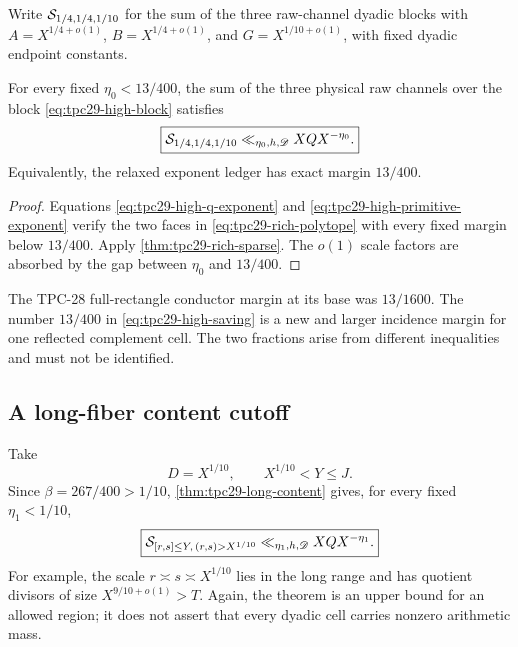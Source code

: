 Write $\mathcal S_{1/4,1/4,1/10}$ for the sum of the three raw-channel
dyadic blocks with
$A=X^{1/4+o(1)}$, $B=X^{1/4+o(1)}$, and
$G=X^{1/10+o(1)}$, with fixed dyadic endpoint constants.

\begin{corollary}
\label{cor:tpc29-high-sparse}
For every fixed $\eta_0<13/400$, the sum of the three physical raw
channels over the block
\eqref{eq:tpc29-high-block} satisfies
\begin{equation}
 \boxed{
 \mathcal S_{1/4,1/4,1/10}
 \ll_{\eta_0,h,\mathscr D}XQX^{-\eta_0}.}
 \label{eq:tpc29-high-sparse-bound}
\end{equation}
Equivalently, the relaxed exponent ledger has exact margin $13/400$.
\end{corollary}

\begin{proof}
Equations \eqref{eq:tpc29-high-q-exponent} and
\eqref{eq:tpc29-high-primitive-exponent} verify the two faces in
\eqref{eq:tpc29-rich-polytope} with every fixed margin below
$13/400$.  Apply \cref{thm:tpc29-rich-sparse}.  The $o(1)$ scale
factors are absorbed by the gap between $\eta_0$ and $13/400$.
\end{proof}

\begin{remark}
\label{rem:tpc29-two-thirteens}
The TPC-28 full-rectangle conductor margin at its base was $13/1600$.
The number $13/400$ in \eqref{eq:tpc29-high-saving} is a new and
larger incidence margin for one reflected complement cell.  The two
fractions arise from different inequalities and must not be
identified.
\end{remark}

\subsection{A long-fiber content cutoff}

Take
\begin{equation}
 D=X^{1/10},\qquad X^{1/10}<Y\le J.
 \label{eq:tpc29-high-long-cutoff}
\end{equation}
Since $\beta=267/400>1/10$,
\cref{thm:tpc29-long-content} gives, for every fixed
$\eta_1<1/10$,
\begin{equation}
 \boxed{
 \mathcal S_{[r,s]\le Y,\,(r,s)>X^{1/10}}
 \ll_{\eta_1,h,\mathscr D}XQX^{-\eta_1}.}
 \label{eq:tpc29-high-long-bound}
\end{equation}
For example, the scale $r\asymp s\asymp X^{1/10}$ lies in the long
range and has quotient divisors of size $X^{9/10+o(1)}>T$.  Again,
the theorem is an upper bound for an allowed region; it does not
assert that every dyadic cell carries nonzero arithmetic mass.

